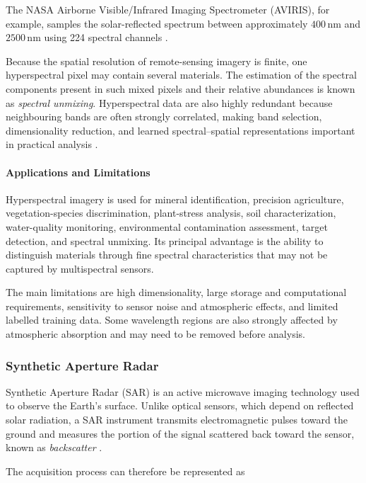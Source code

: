\documentclass[11pt,a4paper]{article}
\begin{document}
The NASA Airborne Visible/Infrared Imaging Spectrometer (AVIRIS), for
example, samples the solar-reflected spectrum between approximately
\(400\,\mathrm{nm}\) and \(2500\,\mathrm{nm}\) using 224 spectral
channels \cite{jpl_imaging_spectroscopy}.

Because the spatial resolution of remote-sensing imagery is finite, one
hyperspectral pixel may contain several materials. The estimation of the
spectral components present in such mixed pixels and their relative
abundances is known as \textit{spectral unmixing}. Hyperspectral data are
also highly redundant because neighbouring bands are often strongly
correlated, making band selection, dimensionality reduction, and learned
spectral--spatial representations important in practical analysis
\cite{bioucasdias2013hyperspectral}.

\paragraph{Applications and Limitations}

Hyperspectral imagery is used for mineral identification, precision
agriculture, vegetation-species discrimination, plant-stress analysis,
soil characterization, water-quality monitoring, environmental
contamination assessment, target detection, and spectral unmixing. Its
principal advantage is the ability to distinguish materials through fine
spectral characteristics that may not be captured by multispectral
sensors.

The main limitations are high dimensionality, large storage and
computational requirements, sensitivity to sensor noise and atmospheric
effects, and limited labelled training data. Some wavelength regions are
also strongly affected by atmospheric absorption and may need to be
removed before analysis.

\subsubsection{Synthetic Aperture Radar}

Synthetic Aperture Radar (SAR) is an active microwave imaging technology
used to observe the Earth's surface. Unlike optical sensors, which depend
on reflected solar radiation, a SAR instrument transmits electromagnetic
pulses toward the ground and measures the portion of the signal scattered
back toward the sensor, known as \textit{backscatter}
\cite{moreira2013sar}.

The acquisition process can therefore be represented as
\end{document}
